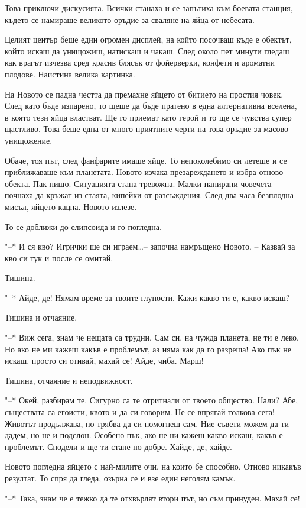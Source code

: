 \documentclass[ebook,openany,12pt]{memoir}
\begin{document}
Това приключи дискусията. Всички станаха и се запътиха към боевата станция, където се намираше великото оръдие за сваляне на яйца от небесата.

Целият център беше един огромен дисплей, на който посочваш къде е обектът, който искаш да унищожиш, натискаш и чакаш. След около пет минути гледаш как врагът изчезва сред красив блясък от фойерверки, конфети и ароматни плодове. Наистина велика картинка. 

На Новото се падна честта да премахне яйцето от битието на простия човек. След като бъде изпарено, то щеше да бъде пратено в една алтернативна вселена, в която тези яйца властват. Ще го приемат като герой и то ще се чувства супер щастливо. Това беше една от много приятните черти на това оръдие за масово унищожение.

Обаче, тоя път, след фанфарите имаше яйце. То непоколебимо си летеше и се приближаваше към планетата. Новото изчака презареждането и избра отново обекта. Пак нищо. Ситуацията стана тревожна. Малки панирани човечета почнаха да кръжат из стаята, кипейки от разсъждения. След два часа безплодна мисъл, яйцето кацна. Новото излезе.

То се доближи до елипсоида и го погледна.

"--* И ся кво? Игрички ше си играем\ldots – започна намръщено Новото. – Казвай за кво си тук и после се омитай.

Тишина.

"--* Айде, де! Нямам време за твоите глупости. Кажи какво ти е, какво искаш?

Тишина и отчаяние.

"--* Виж сега, знам че нещата са трудни. Сам си, на чужда планета, не ти е леко. Но ако не ми кажеш какъв е проблемът, аз няма как да го разреша! Ако пък не искаш, просто си отивай, махай се! Айде, чиба. Марш!

Тишина, отчаяние и неподвижност.

"--* Окей, разбирам те. Сигурно са те отритнали от твоето общество. Нали? Абе, съществата са егоисти, квото и да си говорим. Не се впрягай толкова сега! Животът продължава, но трябва да си помогнеш сам. Ние съвети можем да ти дадем, но не и подслон. Особено пък, ако не ни кажеш какво искаш, какъв е проблемът. Сподели и ще ти стане по-добре. Хайде, де, хайде.

Новото погледна яйцето с най-милите очи, на които бе способно. Отново никакъв резултат. То спря да гледа, озърна се и взе един неголям камък. 

"--* Така, знам че е тежко да те отхвърлят втори път, но съм принуден. Махай се!
\end{document}
